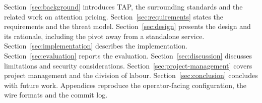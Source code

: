 Section~\ref{sec:background} introduces TAP, the surrounding standards and the related
work on attention pricing. Section~\ref{sec:requirements} states the requirements and the
threat model. Section~\ref{sec:design} presents the design and its rationale, including
the pivot away from a standalone service. Section~\ref{sec:implementation} describes the
implementation. Section~\ref{sec:evaluation} reports the evaluation.
Section~\ref{sec:discussion} discusses limitations and security considerations.
Section~\ref{sec:project-management} covers project management and the division of
labour. Section~\ref{sec:conclusion} concludes with future work. Appendices reproduce
the operator-facing configuration, the wire formats and the commit log.
